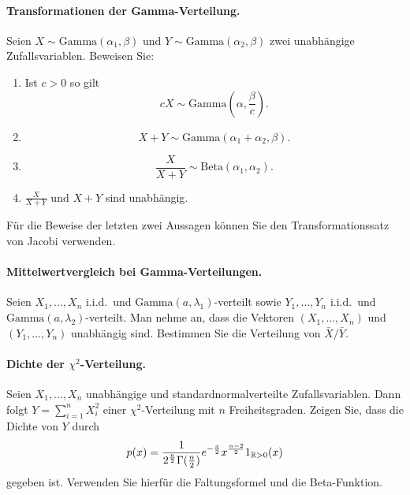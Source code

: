 \paragraph{Transformationen der Gamma-Verteilung. } Seien $X \sim
\textrm{Gamma}(\alpha_1, \beta)$ und $Y \sim \textrm{Gamma}(\alpha_2, \beta)$
zwei unabhängige Zufallsvariablen. Beweisen Sie:
\begin{enumerate}
    \item Ist $c>0$ so gilt
        \begin{equation*}
            c X \sim \text{Gamma}(\alpha, \frac{\beta}{c}).
        \end{equation*}
    \item \begin{equation*}
            X + Y \sim \text{Gamma}(\alpha_1 + \alpha_2, \beta).
        \end{equation*}
    \item \begin{equation*}
            \frac{X}{X+Y} \sim \text{Beta}(\alpha_1, \alpha_2).
        \end{equation*}
    \item $\frac{X}{X+Y}$ und $X+Y$ sind unabhängig. 
\end{enumerate}
Für die Beweise der letzten zwei Aussagen können Sie den Transformationssatz von Jacobi
verwenden. 

\paragraph{Mittelwertvergleich bei Gamma-Verteilungen. }
Seien $X_1,\ldots,X_n$ i.i.d.\ und $\textrm{Gamma}(a, \lambda_1)$-verteilt sowie
$Y_1,\ldots,Y_n$ i.i.d.\ und $\textrm{Gamma}(a,\lambda_2)$-verteilt. Man nehme an,
dass die Vektoren $(X_1,\ldots,X_n)$ und $(Y_1,\ldots,Y_n)$ unabhängig sind. 
Bestimmen Sie die Verteilung von $\bar X/\bar Y$.

\paragraph{Dichte der $\chi^2$-Verteilung. }   Seien $X_1,\ldots,X_n$ unabhängige und
standardnormalverteilte Zufallsvariablen. Dann folgt $Y= \sum_{i=1}^{n} X_i^2$ einer
$\chi^2$-Verteilung mit $n$ Freiheitsgraden. Zeigen Sie, dass die Dichte von $Y$ durch
\begin{equation*}
    p(x) = \frac{1}{ 2^{\frac{n}{2}} \Gamma(\frac{n}{2})}e^{-\frac{x}{2}} x^{\frac{n-2}{2}} 1_{\mathbb R>0}(x)
\end{equation*}
gegeben ist. Verwenden Sie hierfür die Faltungsformel und die Beta-Funktion.

